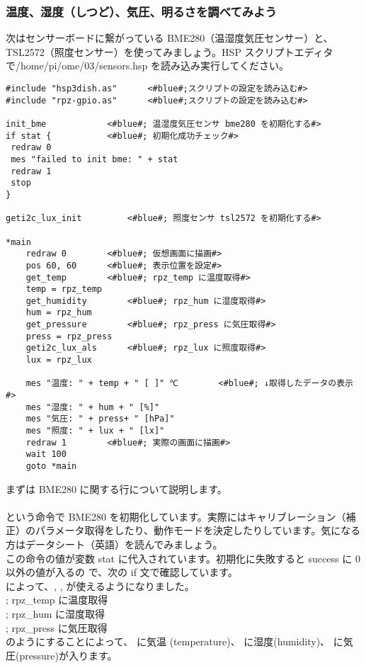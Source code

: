 \subsubsection{温度、湿度（しつど）、気圧、明るさを調べてみよう}\label{sec:sensors}
次はセンサーボードに繋がっている BME280（温湿度気圧センサー）と、TSL2572（照度センサー）を使ってみましょう。HSP スクリプトエディタで/home/pi/ome/03/sensors.hsp を読み込み実行してください。\\

\begin{lstlisting}[caption=sensors.hsp,label=sensors.hsp]
#include "hsp3dish.as"		<#blue#;スクリプトの設定を読み込む#>
#include "rpz-gpio.as"		<#blue#;スクリプトの設定を読み込む#>

init_bme			<#blue#; 温湿度気圧センサ bme280 を初期化する#>
if stat { 			<#blue#; 初期化成功チェック#>
 redraw 0
 mes "failed to init bme: " + stat
 redraw 1
 stop
}

geti2c_lux_init 		<#blue#; 照度センサ tsl2572 を初期化する#>

*main
	redraw 0 		<#blue#; 仮想画面に描画#>
	pos 60, 60 		<#blue#; 表示位置を設定#>
	get_temp		<#blue#; rpz_temp に温度取得#>
	temp = rpz_temp
	get_humidity		<#blue#; rpz_hum に湿度取得#>
	hum = rpz_hum
	get_pressure		<#blue#; rpz_press に気圧取得#>
	press = rpz_press
	geti2c_lux_als		<#blue#; rpz_lux に照度取得#>
	lux = rpz_lux

	mes "温度: " + temp + " [ ]" ℃		<#blue#; ↓取得したデータの表示#>
	mes "湿度: " + hum + " [%]"
	mes "気圧: " + press+ " [hPa]"
	mes "照度: " + lux + " [lx]"
	redraw 1		<#blue#; 実際の画面に描画#>
	wait 100
	goto *main
\end{lstlisting}

まずは BME280 に関する行について説明します。\\
\\
という命令で BME280 を初期化しています。実際にはキャリブレーション（補正）のパラメータ取得をしたり、動作モードを決定したりしています。気になる方はデータシート（英語）を読んでみましょう。\\
この命令の値が変数 stat に代入されています。初期化に失敗すると success に 0 以外の値が入るの
で、次の if 文で確認しています。\\
 によって、, ,  が使えるようになりました。\\
	; rpz\_temp に温度取得\\
	; rpz\_hum に湿度取得\\
	; rpz\_press に気圧取得\\
のようにすることによって、 に気温 (temperature)、  に湿度(humidity)、 に気圧(pressure)が入ります。

